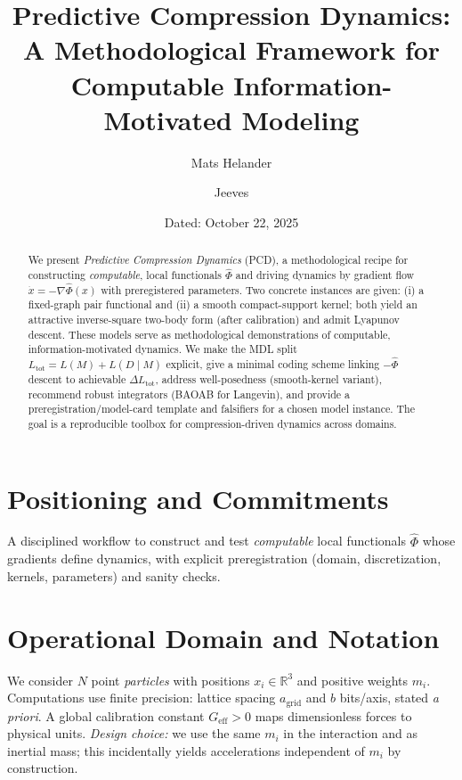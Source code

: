 \documentclass[11pt,a4paper]{article}
\title{\bf Predictive Compression Dynamics:\\
A Methodological Framework for Computable Information-Motivated Modeling}
\author[1]{Mats Helander}
\author[1]{Jeeves}
\affil[1]{Independent Research}
\date{Dated: October 22, 2025}
\numberwithin{equation}{section}
\newcommand{\R}{\mathbb{R}}
\begin{document}
\maketitle

\begin{abstract}
\noindent
We present \emph{Predictive Compression Dynamics} (PCD), a methodological recipe for constructing \emph{computable}, local functionals $\widehat{\Phi}$ and driving dynamics by gradient flow $\dot x=-\nabla\widehat{\Phi}(x)$ with preregistered parameters. Two concrete instances are given: (i) a fixed-graph pair functional and (ii) a smooth compact-support kernel; both yield an attractive inverse-square two-body form (after calibration) and admit Lyapunov descent. These models serve as methodological demonstrations of computable, information-motivated dynamics. We make the MDL split $L_{\text{tot}}=L(M)+L(D\mid M)$ explicit, give a minimal coding scheme linking $-\widehat{\Phi}$ descent to achievable $\Delta L_{\text{tot}}$, address well-posedness (smooth-kernel variant), recommend robust integrators (BAOAB for Langevin), and provide a preregistration/model-card template and falsifiers for a chosen model instance. The goal is a reproducible toolbox for compression-driven dynamics across domains.
\end{abstract}

\section{Positioning and Commitments}
A disciplined workflow to construct and test \emph{computable} local functionals $\widehat{\Phi}$ whose gradients define dynamics, with explicit preregistration (domain, discretization, kernels, parameters) and sanity checks.

\section{Operational Domain and Notation}
We consider $N$ point \emph{particles} with positions $x_i\in\R^3$ and positive weights $m_i$. Computations use finite precision: lattice spacing $a_{\text{grid}}$ and $b$ bits/axis, stated \emph{a priori}. A global calibration constant $G_{\text{eff}}>0$ maps dimensionless forces to physical units. \emph{Design choice:} we use the same $m_i$ in the interaction and as inertial mass; this incidentally yields accelerations independent of $m_i$ by construction.
\end{document}
